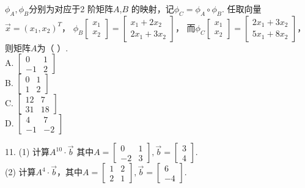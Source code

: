 \begin{ex}\label{8.10}
$\phi_A,\phi_B$分别为对应于2 阶矩阵$A$,$B$ 的映射，记$\phi_C=\phi_A\circ\phi_B$. 任取向量$\vec{x}=(x_1,x_2 )^T$，
$\phi_B\begin{bmatrix}x_1\\x_2\end{bmatrix}=\begin{bmatrix}x_1+2x_2\\2x_1+3x_2\end{bmatrix}$，
而$\phi_C\begin{bmatrix}x_1\\x_2\end{bmatrix}=\begin{bmatrix}2x_1+3x_2\\5x_1+8x_2\end{bmatrix}$，则矩阵$A$为（     ）.\\
A.  $\begin{bmatrix}0&1\\-1&2\end{bmatrix}$\\
B.  $\begin{bmatrix}0&1\\1&2\end{bmatrix}$\\
C.  $\begin{bmatrix}12&7\\31&18\end{bmatrix}$\\
D.  $\begin{bmatrix}4&7\\-1&-2\end{bmatrix}$
\end{ex}

\begin{ex}\label{8.11}
11. (1) 计算$A^{10}\cdot\vec{b}$ 其中$A=\begin{bmatrix}0&1\\-2&3\end{bmatrix},\vec{b}=\begin{bmatrix}3\\4\end{bmatrix}$.\\
(2) 计算$A^4\cdot\vec{b}$，其中$A=\begin{bmatrix}1&2\\2&1\end{bmatrix},\vec{b}=\begin{bmatrix}6\\-4\end{bmatrix}$.
\end{ex}

